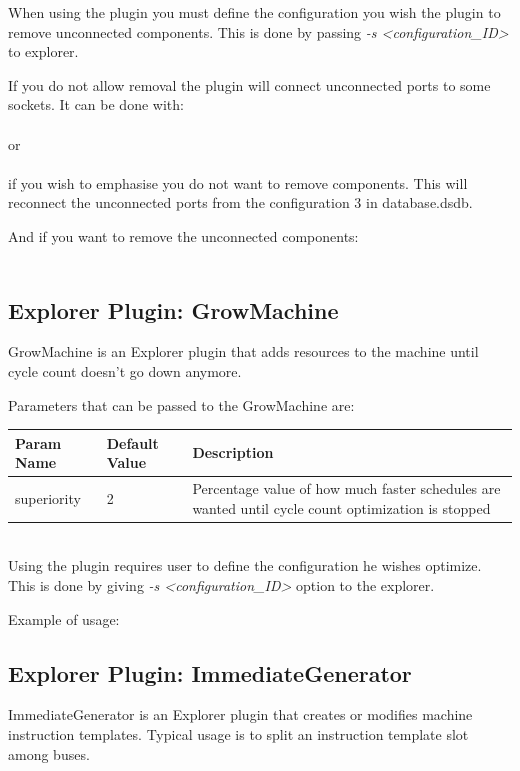 \documentclass[twoside]{tceusermanual}
\begin{document}
When using the plugin you must define the configuration you wish the plugin
to remove unconnected components. This is done by passing 
\textit{-s <configuration\_ID>} to explorer.

If you do not allow removal the plugin will connect unconnected ports to some
sockets. It can be done with: \\
\\
or \\
\\
if you wish to emphasise you do not want to remove components. This will
reconnect the unconnected ports from the configuration 3 in database.dsdb.

And if you want to remove the unconnected components: \\
\\

\subsection{Explorer Plugin: GrowMachine}
GrowMachine is an Explorer plugin that adds resources to the machine until
cycle count doesn't go down anymore.

Parameters that can be passed to the GrowMachine are:

\begin{tabular}{p{}p{}
                p{}}
\textbf{Param Name} &\textbf{Default Value} &\textbf{Description} \\
\hline
superiority & 2 & Percentage value of how much faster schedules are wanted
    until cycle count optimization is stopped \\
\end{tabular}\\

Using the plugin requires user to define the configuration he wishes optimize.
This is done by giving \textit{-s <configuration\_ID>} option to the explorer.

Example of usage:


\subsection{Explorer Plugin: ImmediateGenerator}
ImmediateGenerator is an Explorer plugin that creates or modifies machine
instruction templates. Typical usage is to split an instruction template slot
among buses.
\end{document}
